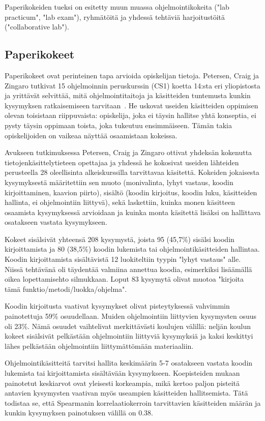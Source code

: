 \documentclass[finnish]{../tktltiki2}
\theoremstyle{definition}
\theoremstyle{remark}
\begin{document}
Paperikokeiden tueksi on esitetty muun muassa ohjelmointikokeita ("lab practicum", "lab exam"), ryhmätöitä ja yhdessä tehtäviä harjoitustöitä ("collaborative lab").

\subsection{Paperikokeet}

Paperikokeet ovat perinteinen tapa arvioida opiskelijan tietoja. Petersen, Craig ja Zingaro tutkivat 15 ohjelmoinnin peruskurssin (CS1) koetta 14:sta eri yliopistosta ja yrittävät selvittää, mitä ohjelmointitaitoja ja käsitteiden tuntemusta kunkin kysymyksen ratkaisemiseen tarvitaan~\cite{PCZ11}. He uskovat useiden käsitteiden oppimisen olevan toisistaan riippuvaista: opiskelija, joka ei täysin hallitse yhtä konseptia, ei pysty täysin oppimaan toista, joka tukeutuu ensimmäiseen. Tämän takia opiskelijoiden on vaikeaa näyttää osaamistaan kokeissa.

Avukseen tutkimuksessa Petersen, Craig ja Zingaro ottivat yhdeksän kokenutta tietojenkäsittelytieteen opettajaa ja yhdessä he kokosivat useiden lähteiden perusteella 28 oleellisinta alkeiskurssilla tarvittavaa käsitettä. Kokeiden jokaisesta kysymyksestä määritettiin sen muoto (monivalinta, lyhyt vastaus, koodin kirjoittaminen, kaavion piirto), sisältö (koodin kirjoitus, koodin luku, käsitteiden hallinta, ei ohjelmointiin liittyvä), sekä laskettiin, kuinka monen käsitteen osaamista kysymyksessä arvioidaan ja kuinka monta käsitettä lisäksi on hallittava osatakseen vastata kysymykseen.

Kokeet sisälsivät yhteensä 208 kysymystä, joista 95 (45,7\%) sisälsi koodin kirjoittamista ja 80 (38,5\%) koodin lukemista tai ohjelmointikäsitteiden hallintaa. Koodin kirjoittamista sisältävistä 12 luokiteltiin tyypin "lyhyt vastaus" alle. Niissä tehtävänä oli täydentää valmiina annettua koodia, esimerkiksi lisäämällä oikea lopettamisehto silmukkaan. Loput 83 kysymytä olivat muotoa "kirjoita tämä funktio/metodi/luokka/ohjelma".

Koodin kirjoitusta vaativat kysymykset olivat pisteytyksessä vahvimmin painotettuja 59\% osuudellaan. Muiden ohjelmointiin liittyvien kysymysten osuus oli 23\%. Nämä osuudet vaihtelivat merkittävästi koulujen välillä: neljän koulun kokeet sisälsivät pelkästään ohjelmointiin liittyviä kysymyksiä ja kaksi keskittyi lähes pelkästään ohjelmointiin liittymättömään materiaaliin.

Ohjelmointikäsitteitä tarvitsi hallita keskimäärin 5-7 osatakseen vastata koodin lukemista tai kirjoittamista sisältävään kysymykseen. Koepisteiden mukaan painotetut keskiarvot ovat yleisesti korkeampia, mikä kertoo paljon pisteitä antavien kysymysten vaativan myös useampien käsitteiden hallitsemista. Tätä todistaa se, että Spearmanin korrelaatiokerroin tarvittavien käsitteiden määrän ja kunkin kysymyksen painotuksen välillä on 0.38.
\end{document}
